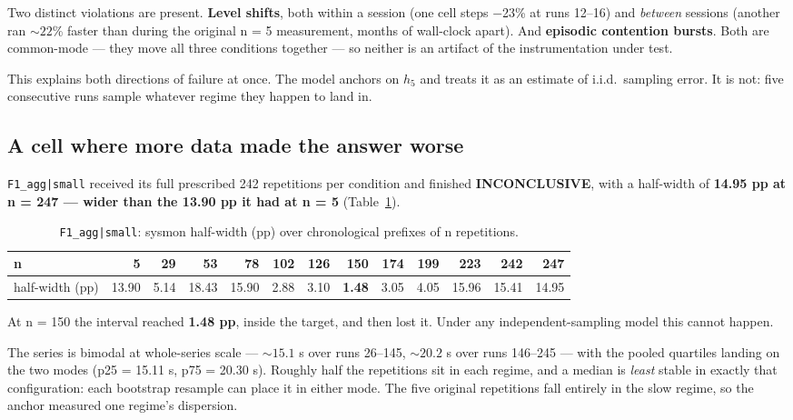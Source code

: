 \documentclass[sigconf,review,anonymous]{acmart}
\newcommand{\cell}[1]{\texttt{#1}}
\begin{document}
Two distinct violations are present. \textbf{Level shifts}, both within a session (one cell steps
−23\% at runs 12--16) and \emph{between} sessions (another ran ${\sim}22$\% faster than during the original
n = 5 measurement, months of wall-clock apart). And \textbf{episodic contention bursts}. Both are
common-mode --- they move all three conditions together --- so neither is an artifact of the
instrumentation under test.

This explains both directions of failure at once. The model anchors on $h_5$ and treats it as
an estimate of i.i.d.\ sampling error. It is not: five consecutive runs sample whatever regime
they happen to land in.

\subsection{A cell where more data made the answer worse}\label{sec:worse}

\cell{F1\_agg|small} received its full prescribed 242 repetitions per condition and finished
\textbf{INCONCLUSIVE}, with a half-width of \textbf{14.95 pp at n = 247 --- wider than the 13.90 pp it had at
n = 5} (Table~\ref{tab:trajectory}).

\begin{table}[t]
\caption{\cell{F1\_agg|small}: sysmon half-width (pp) over chronological prefixes of n repetitions.}\label{tab:trajectory}
\small
\setlength{\tabcolsep}{4pt}
\begin{tabular}{lrrrrrrrrrrrr}
\toprule
n & 5 & 29 & 53 & 78 & 102 & 126 & \textbf{150} & 174 & 199 & 223 & 242 & 247 \\
\midrule
half-width (pp) & 13.90 & 5.14 & 18.43 & 15.90 & 2.88 & 3.10 & \textbf{1.48} & 3.05 & 4.05 & 15.96 & 15.41 & 14.95 \\
\bottomrule
\end{tabular}
\end{table}

At n = 150 the interval reached \textbf{1.48 pp}, inside the target, and then lost it. Under any
independent-sampling model this cannot happen.

The series is bimodal at whole-series scale --- ${\sim}15.1$ s over runs 26--145, ${\sim}20.2$ s over runs
146--245 --- with the pooled quartiles landing on the two modes (p25 = 15.11 s, p75 = 20.30 s).
Roughly half the repetitions sit in each regime, and a median is \emph{least} stable in exactly that
configuration: each bootstrap resample can place it in either mode. The five original
repetitions fall entirely in the slow regime, so the anchor measured one regime's dispersion.
\end{document}
